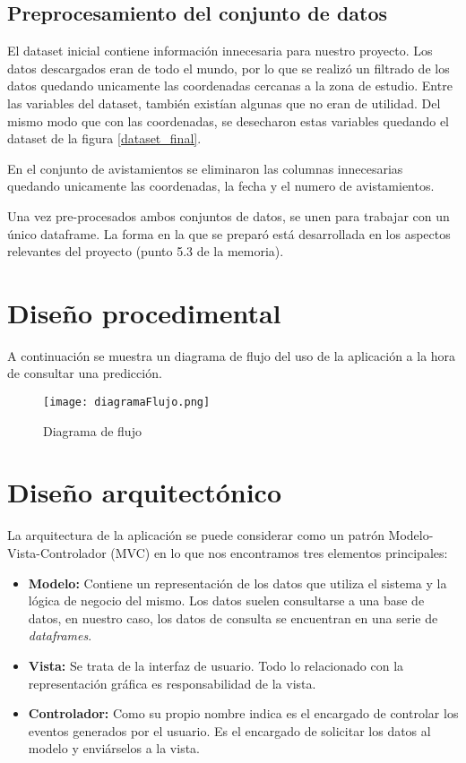 \subsection{Preprocesamiento del conjunto de datos}

El dataset inicial contiene información innecesaria para nuestro proyecto. Los datos descargados eran de todo el mundo, por lo que se realizó un filtrado de los datos quedando unicamente las coordenadas cercanas a la zona de estudio. Entre las variables del dataset, también existían algunas que no eran de utilidad. Del mismo modo que con las coordenadas, se desecharon estas variables quedando el dataset de la figura \ref{dataset_final}.

\label{dataset_final}

En el conjunto de avistamientos se eliminaron las columnas innecesarias quedando unicamente las coordenadas, la fecha y el numero de avistamientos.

Una vez pre-procesados ambos conjuntos de datos, se unen para trabajar con un único dataframe. La forma en la que se preparó está desarrollada en los aspectos relevantes del proyecto (punto 5.3 de la memoria).

\section{Diseño procedimental}

A continuación se muestra un diagrama de flujo del uso de la aplicación a la hora de consultar una predicción.

\begin{figure}[!h]
	\centering
	\texttt{[image: diagramaFlujo.png]}
	\caption{Diagrama de flujo}\label{fig:diagrama}
\end{figure}

\section{Diseño arquitectónico}

La arquitectura de la aplicación se puede considerar como un patrón Modelo-Vista-Controlador (MVC) \cite{mvc} en lo que nos encontramos tres elementos principales:

\begin{itemize}
	\item \textbf{Modelo:} Contiene un representación de los datos que utiliza el sistema y la lógica de negocio del mismo. Los datos suelen consultarse a una base de datos, en nuestro caso, los datos de consulta se encuentran en una serie de \emph{dataframes}.
	\item \textbf{Vista:} Se trata de la interfaz de usuario. Todo lo relacionado con la representación gráfica es responsabilidad de la vista.
	\item \textbf{Controlador:} Como su propio nombre indica es el encargado de controlar los eventos generados por el usuario. Es el encargado de solicitar los datos al modelo y enviárselos a la vista.
\end{itemize}

